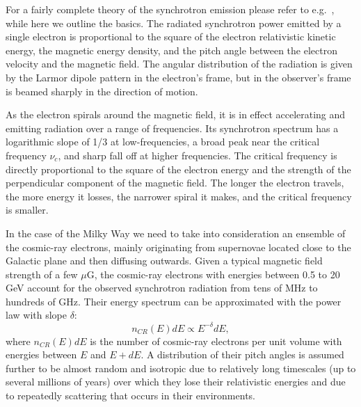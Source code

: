 For a fairly complete theory of the synchrotron emission  please refer to e.g.~\cite{pacholczyk70,  rybicki86}, while here we outline the basics. The radiated synchrotron power emitted by a single electron is proportional to the square of the electron relativistic kinetic energy, the magnetic energy density, and the pitch angle between the electron velocity and the magnetic field.  The angular distribution of the radiation is given by the Larmor dipole pattern in the electron's frame, but in the observer's frame is beamed sharply in the direction of motion. 

As the electron spirals around the magnetic field, it is in effect accelerating and emitting radiation over a range of frequencies. Its synchrotron spectrum has a logarithmic slope of 1/3 at low-frequencies, a broad peak near the critical frequency $\nu_c$, and sharp fall off at higher frequencies. The critical frequency is directly proportional to the square of the electron energy and the strength of the perpendicular component of the magnetic field. The longer the electron travels, the more energy it losses, the narrower spiral it makes, and the critical frequency is smaller. 

In the case of the Milky Way we need to take into consideration an ensemble of the cosmic-ray electrons, mainly originating from supernovae located close to the Galactic plane and then diffusing outwards. Given a typical magnetic field strength of a few $\mu$G, the cosmic-ray electrons with energies between 0.5 to 20 GeV account for the observed synchrotron radiation from tens of MHz to hundreds of GHz. Their energy spectrum can be approximated with the power law with slope $\delta$:
\begin{equation}\label{eq:ncr}
n_{CR}(E)dE\propto E^{-\delta}dE,
\end{equation}
where $n_{CR}(E)dE$ is the number of cosmic-ray electrons per unit volume with energies between $E$ and $E+dE$. A distribution of their pitch angles is assumed further to be almost random and isotropic due to relatively long timescales (up to several millions of years) over which they lose their relativistic energies and due to repeatedly scattering that occurs in their environments. 

